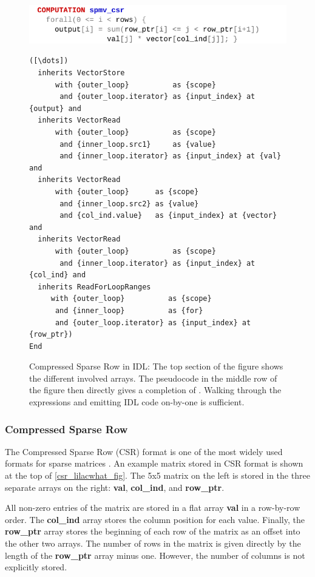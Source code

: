 \begin{figure}[p]
\includegraphics[width=\linewidth]{figures/spmvcsrwhat.pdf}
\vspace{-1.5em}
\begin{lstlisting}[language=IDL,firstnumber=7]
([\dots])
  inherits VectorStore
      with {outer_loop}          as {scope}
       and {outer_loop.iterator} as {input_index} at {output} and
  inherits VectorRead
      with {outer_loop}          as {scope}
       and {inner_loop.src1}     as {value}
       and {inner_loop.iterator} as {input_index} at {val} and
  inherits VectorRead
      with {outer_loop}      as {scope}
       and {inner_loop.src2} as {value}
       and {col_ind.value}   as {input_index} at {vector} and
  inherits VectorRead
      with {outer_loop}          as {scope}
       and {inner_loop.iterator} as {input_index} at {col_ind} and
  inherits ReadForLoopRanges
     with {outer_loop}          as {scope}
      and {inner_loop}          as {for}
      and {outer_loop.iterator} as {input_index} at {row_ptr})
End
\end{lstlisting}
\caption{Compressed Sparse Row in IDL:
         The top section of the figure shows the different involved arrays.
         The pseudocode in the middle row of the
         figure then directly gives a completion of .
         Walking through the expressions and emitting IDL code on-by-one is
         sufficient.}
\label{csr_lilacwhat_fig}
\end{figure}

\subsubsection{Compressed Sparse Row}

    The Compressed Sparse Row (CSR) format is one of the most widely used
    formats for sparse matrices \cite{doi:10.1137/1.9780898718003}.
    An example matrix stored in CSR format is shown at the top of
    \autoref{csr_lilacwhat_fig}.
    The 5x5 matrix on the left is stored in the three separate arrays on the
    right: \textbf{val}, \textbf{col\_ind}, and \textbf{row\_ptr}.

    All non-zero entries of the matrix are stored in a flat array \textbf{val}
    in a row-by-row order.
    The \textbf{col\_ind} array stores the column position for each value.
    Finally, the \textbf{row\_ptr} array stores the beginning of each row of the
    matrix as an offset into the other two arrays.
    The number of rows in the matrix is given directly by the length of the
    \textbf{row\_ptr} array minus one.
    However, the number of columns is not explicitly stored.

